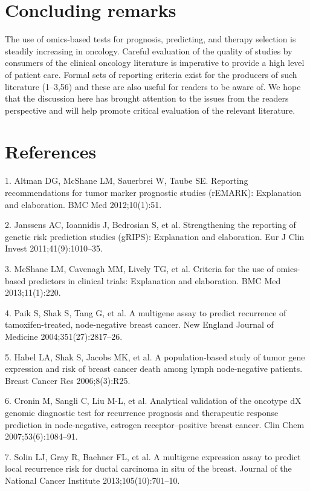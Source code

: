 \documentclass[11pt]{article}
\begin{document}
\section{Concluding remarks}\label{concluding-remarks}

The use of omics-based tests for prognosis, predicting, and therapy
selection is steadily increasing in oncology. Careful evaluation of the
quality of studies by consumers of the clinical oncology literature is
imperative to provide a high level of patient care. Formal sets of
reporting criteria exist for the producers of such literature (1--3,56)
and these are also useful for readers to be aware of. We hope that the
discussion here has brought attention to the issues from the readers
perspective and will help promote critical evaluation of the relevant
literature.

\section{References}\label{references}

\setlength{\parindent}{0pt}

1. Altman DG, McShane LM, Sauerbrei W, Taube SE. Reporting
recommendations for tumor marker prognostic studies (rEMARK):
Explanation and elaboration. BMC Med 2012;10(1):51.

2. Janssens AC, Ioannidis J, Bedrosian S, et al. Strengthening the
reporting of genetic risk prediction studies (gRIPS): Explanation and
elaboration. Eur J Clin Invest 2011;41(9):1010--35.

3. McShane LM, Cavenagh MM, Lively TG, et al. Criteria for the use of
omics-based predictors in clinical trials: Explanation and elaboration.
BMC Med 2013;11(1):220.

4. Paik S, Shak S, Tang G, et al. A multigene assay to predict
recurrence of tamoxifen-treated, node-negative breast cancer. New
England Journal of Medicine 2004;351(27):2817--26.

5. Habel LA, Shak S, Jacobs MK, et al. A population-based study of tumor
gene expression and risk of breast cancer death among lymph
node-negative patients. Breast Cancer Res 2006;8(3):R25.

6. Cronin M, Sangli C, Liu M-L, et al. Analytical validation of the
oncotype dX genomic diagnostic test for recurrence prognosis and
therapeutic response prediction in node-negative, estrogen
receptor--positive breast cancer. Clin Chem 2007;53(6):1084--91.

7. Solin LJ, Gray R, Baehner FL, et al. A multigene expression assay to
predict local recurrence risk for ductal carcinoma in situ of the
breast. Journal of the National Cancer Institute 2013;105(10):701--10.
\end{document}
